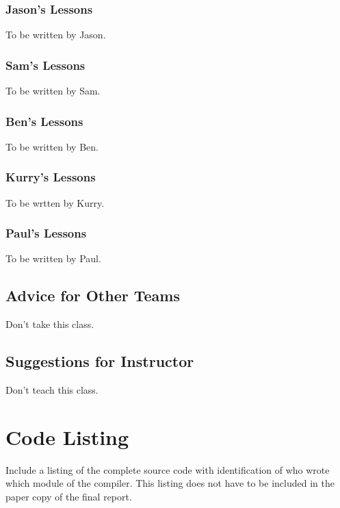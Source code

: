 \documentclass{book}
\begin{document}
\subsection{Jason's Lessons}
\label{sub:jasons-lessons}

To be written by Jason.

\subsection{Sam's Lessons}
\label{sub:sams-lessons}

To be written by Sam.

\subsection{Ben's Lessons}
\label{sub:bens-lessons}

To be written by Ben.

\subsection{Kurry's Lessons}
\label{sub:kurrys-lessons}

To be wrtten by Kurry.

\subsection{Paul's Lessons}
\label{sub:pauls-lessons}

To be written by Paul.

\section{Advice for Other Teams}

Don't take this class.

\section{Suggestions for Instructor}

Don't teach this class.

\appendix

\chapter{Code Listing}

Include a listing of the complete source code with identification of who wrote which module of the compiler. This listing does not have to be included in the paper copy of the final report.

\nocite{*}


\end{document}
